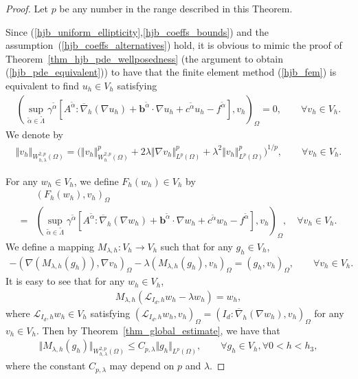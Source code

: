 \documentclass[12pt]{amsart}
\theoremstyle{definition}
\theoremstyle{remark}
\begin{document}
\begin{proof}
Let $p$ be any number in the range described in this Theorem.

Since (\ref{hjb_uniform_ellipticity},\ref{hjb_coeffs_bounds}) 
and the assumption~(\ref{hjb_coeffs_alternatives}) hold, 
it is obvious to mimic the proof of Theorem~\ref{thm_hjb_pde_wellposedness} 
(the argument to obtain (\ref{hjb_pde_equivalent})) to 
have that the finite element method (\ref{hjb_fem}) is equivalent to find 
$u_{h}\in V_{h}$ satisfying 
\begin{align}
\label{hjb_fem_equivalent}
(\sup_{\tilde{\alpha}\in \tilde{\Lambda}}\gamma^{\tilde{\alpha}}
[A^{\tilde{\alpha}}:\overline{\nabla}_{h}
(\nabla u_{h}) + \boldsymbol{b}^{\tilde{\alpha}}\cdot\nabla u_{h} 
+ c^{\tilde{\alpha}}u_{h} - f^{\tilde{\alpha}}], v_{h})_{\Omega} = 0, 
\qquad \forall v_{h} \in V_{h}.
\end{align}
We denote by 
\begin{align*}
\Vert v_{h}\Vert_{W_{h,\lambda}^{2,p}(\Omega)}= 
\big( \Vert v_{h}\Vert_{W_{h}^{2,p}(\Omega)}^{p} 
+ 2\lambda\Vert \nabla v_{h}\Vert_{L^{p}(\Omega)}^{p} 
+ \lambda^{2}\Vert v_{h}\Vert_{L^{p}(\Omega)}^{p} \big)^{1/p}, 
\qquad \forall v_{h} \in V_{h}.
\end{align*}


For any $w_{h} \in V_{h}$, we define $F_{h}(w_{h}) \in V_{h}$ by 
\begin{align*}
&(F_{h}(w_{h}), v_{h})_{\Omega} \\ 
= &(\sup_{\tilde{\alpha}\in \tilde{\Lambda}}\gamma^{\tilde{\alpha}}
[A^{\tilde{\alpha}}:\overline{\nabla}_{h}
(\nabla w_{h}) + \boldsymbol{b}^{\tilde{\alpha}}\cdot\nabla w_{h} 
+ c^{\tilde{\alpha}}w_{h} - f^{\tilde{\alpha}}], v_{h})_{\Omega}, 
\quad \forall v_{h} \in V_{h}.
\end{align*}
We define a mapping $M_{\lambda,h}:V_{h} 
\rightarrow V_{h}$ such that for any $g_{h} \in V_{h}$, 
\begin{align*}
-(\nabla (M_{\lambda,h}(g_{h})), \nabla v_{h})_{\Omega} 
- \lambda (M_{\lambda,h}(g_{h}),v_{h})_{\Omega} = 
(g_{h}, v_{h})_{\Omega},\qquad \forall v_{h} \in V_{h}.
\end{align*} 
It is easy to see that for any $w_{h}\in V_{h}$,
\begin{align*}
M_{\lambda,h}(\mathcal{L}_{I_{d},h}w_{h}-\lambda w_{h}) = w_{h},
\end{align*}
where $\mathcal{L}_{I_{d},h}w_{h} \in V_{h}$ satisfying  
$(\mathcal{L}_{I_{d},h}w_{h}, v_{h})_{\Omega}
=(I_{d}:\overline{\nabla}_{h}(\nabla w_{h}),v_{h})_{\Omega}$ 
for any $v_{h} \in V_{h}$.
Then by Theorem~\ref{thm_global_estimate}, we have that 
\begin{align}
\label{coercivity_poisson_fem_lambda_ineq}
\Vert M_{\lambda,h}(g_{h}) \Vert_{W_{h,\lambda}^{2,p}(\Omega)} 
\leq C_{p,\lambda} \Vert g_{h}\Vert_{L^{p}(\Omega)}, \qquad \forall g_{h}\in V_{h},
\forall 0 < h < h_{3},
\end{align}
where the constant $C_{p,\lambda}$ may depend on $p$ and $\lambda$.


\end{proof}
\end{document}
